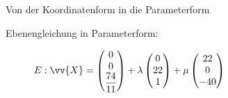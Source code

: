 \begin{merke}{Von der Koordinatenform in die Parameterform}{}
\begin{tcolorbox}[
  colframe=red,
  colback=white,
  boxrule=1pt,
]
\begin{description}
  \item[Ebenengleichung in Parameterform:]
  \(E:\vv{X}=  \begin{pmatrix}
    0\\0\\ \dfrac{74}{11}
  \end{pmatrix}
  + \lambda \begin{pmatrix}
    0\\22\\1
  \end{pmatrix}
  + \mu  \begin{pmatrix}
    22\\0\\-40
  \end{pmatrix}\)
\end{description}
\end{tcolorbox}  
\end{merke}
